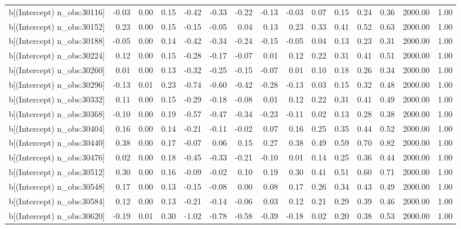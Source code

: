 \begin{table}[ht]
\begin{tabular}{rrrrrrrrrrrrrrr}
  b[(Intercept) n\_obs:30116] & -0.03 & 0.00 & 0.15 & -0.42 & -0.33 & -0.22 & -0.13 & -0.03 & 0.07 & 0.15 & 0.24 & 0.36 & 2000.00 & 1.00 \\ 
  b[(Intercept) n\_obs:30152] & 0.23 & 0.00 & 0.15 & -0.15 & -0.05 & 0.04 & 0.13 & 0.23 & 0.33 & 0.41 & 0.52 & 0.63 & 2000.00 & 1.00 \\ 
  b[(Intercept) n\_obs:30188] & -0.05 & 0.00 & 0.14 & -0.42 & -0.34 & -0.24 & -0.15 & -0.05 & 0.04 & 0.13 & 0.23 & 0.31 & 2000.00 & 1.00 \\ 
  b[(Intercept) n\_obs:30224] & 0.12 & 0.00 & 0.15 & -0.28 & -0.17 & -0.07 & 0.01 & 0.12 & 0.22 & 0.31 & 0.41 & 0.51 & 2000.00 & 1.00 \\ 
  b[(Intercept) n\_obs:30260] & 0.01 & 0.00 & 0.13 & -0.32 & -0.25 & -0.15 & -0.07 & 0.01 & 0.10 & 0.18 & 0.26 & 0.34 & 2000.00 & 1.00 \\ 
  b[(Intercept) n\_obs:30296] & -0.13 & 0.01 & 0.23 & -0.74 & -0.60 & -0.42 & -0.28 & -0.13 & 0.03 & 0.15 & 0.32 & 0.48 & 2000.00 & 1.00 \\ 
  b[(Intercept) n\_obs:30332] & 0.11 & 0.00 & 0.15 & -0.29 & -0.18 & -0.08 & 0.01 & 0.12 & 0.22 & 0.31 & 0.41 & 0.49 & 2000.00 & 1.00 \\ 
  b[(Intercept) n\_obs:30368] & -0.10 & 0.00 & 0.19 & -0.57 & -0.47 & -0.34 & -0.23 & -0.11 & 0.02 & 0.13 & 0.28 & 0.38 & 2000.00 & 1.00 \\ 
  b[(Intercept) n\_obs:30404] & 0.16 & 0.00 & 0.14 & -0.21 & -0.11 & -0.02 & 0.07 & 0.16 & 0.25 & 0.35 & 0.44 & 0.52 & 2000.00 & 1.00 \\ 
  b[(Intercept) n\_obs:30440] & 0.38 & 0.00 & 0.17 & -0.07 & 0.06 & 0.15 & 0.27 & 0.38 & 0.49 & 0.59 & 0.70 & 0.82 & 2000.00 & 1.00 \\ 
  b[(Intercept) n\_obs:30476] & 0.02 & 0.00 & 0.18 & -0.45 & -0.33 & -0.21 & -0.10 & 0.01 & 0.14 & 0.25 & 0.36 & 0.44 & 2000.00 & 1.00 \\ 
  b[(Intercept) n\_obs:30512] & 0.30 & 0.00 & 0.16 & -0.09 & -0.02 & 0.10 & 0.19 & 0.30 & 0.41 & 0.51 & 0.60 & 0.71 & 2000.00 & 1.00 \\ 
  b[(Intercept) n\_obs:30548] & 0.17 & 0.00 & 0.13 & -0.15 & -0.08 & 0.00 & 0.08 & 0.17 & 0.26 & 0.34 & 0.43 & 0.49 & 2000.00 & 1.00 \\ 
  b[(Intercept) n\_obs:30584] & 0.12 & 0.00 & 0.13 & -0.21 & -0.14 & -0.06 & 0.03 & 0.12 & 0.21 & 0.29 & 0.39 & 0.46 & 2000.00 & 1.00 \\ 
  b[(Intercept) n\_obs:30620] & -0.19 & 0.01 & 0.30 & -1.02 & -0.78 & -0.58 & -0.39 & -0.18 & 0.02 & 0.20 & 0.38 & 0.53 & 2000.00 & 1.00 \\ 

\end{tabular}
\end{table}
